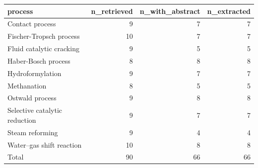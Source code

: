 \begin{tabular}{lrrr}
\toprule
process & n\_retrieved & n\_with\_abstract & n\_extracted \\
\midrule
Contact process & 9 & 7 & 7 \\
Fischer-Tropsch process & 10 & 7 & 7 \\
Fluid catalytic cracking & 9 & 5 & 5 \\
Haber-Bosch process & 8 & 8 & 8 \\
Hydroformylation & 9 & 7 & 7 \\
Methanation & 8 & 5 & 5 \\
Ostwald process & 9 & 8 & 8 \\
Selective catalytic reduction & 9 & 7 & 7 \\
Steam reforming & 9 & 4 & 4 \\
Water–gas shift reaction & 10 & 8 & 8 \\
Total & 90 & 66 & 66 \\
\bottomrule
\end{tabular}
